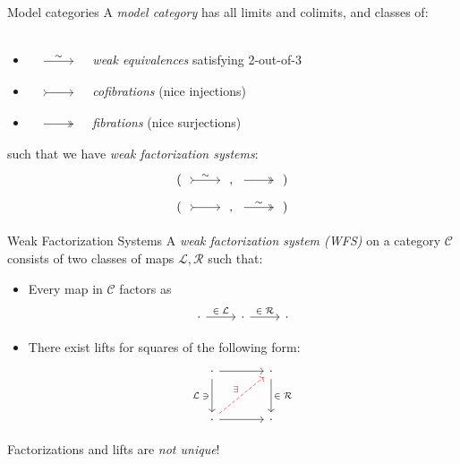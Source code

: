 \documentclass[compress]{beamer}
\newcommand{\varcat}[1]{\mathcal{#1}}
\newcommand{\C}{\varcat{C}}
\renewcommand{\L}{\mathcal{L}}
\newcommand{\R}{\mathcal{R}}
\newcommand{\1}{\mathbf{1}}
\begin{document}
\begin{frame}[fragile]{Model categories}
	A \emph{model category} has all limits and colimits, and classes of: \\~\\
	\begin{itemize} \setlength{\itemsep}{15pt}
		\item $\begin{tikzcd} \phantom{\cdot} \ar[r, "\sim"] & \phantom{\cdot} \end{tikzcd}$ \emph{weak equivalences}  satisfying 2-out-of-3
		\item  $\begin{tikzcd} \phantom{\cdot} \ar[r, rightarrowtail] & \phantom{\cdot} \end{tikzcd}$ \emph{cofibrations} (nice injections)
		\item  $\begin{tikzcd} \phantom{\cdot} \ar[r, two heads] & \phantom{\cdot} \end{tikzcd}$ \emph{fibrations} (nice surjections)
	\end{itemize}
	\pause \vfill
	such that we have \emph{weak factorization systems}:
	\[
		\begin{tikzcd}[row sep = tiny]
			(\phantom{\cdot} \ar[r, rightarrowtail, "\sim"] & \phantom{\cdot},
			 \phantom{\cdot} \ar[r, two heads] & \phantom{\cdot})
			 \\
			(\phantom{\cdot} \ar[r, rightarrowtail] & \phantom{\cdot},
			 \phantom{\cdot} \ar[r, two heads, "\sim"] & \phantom{\cdot})
		\end{tikzcd}
	\]
\end{frame}

\begin{frame}[fragile]{Weak Factorization Systems}
	A \emph{weak factorization system (WFS)} on a category $\C$ consists of two classes of maps $\L, \R$ such that:
	\pause
	\begin{itemize}[<+->]
		\item Every map in $\C$ factors as 
		\[
			\begin{tikzcd}
				\cdot \ar[r, "\in\; \L"] & \cdot \ar[r, "\in \; \R"] & \cdot
			\end{tikzcd}
		\]
		\item There exist lifts for squares of the following form:
		\[
		\begin{tikzcd}[sep = large]
			\cdot \ar[r] \ar[d, "\L \; \ni"'] & \cdot \ar[d, "\in \; \R"]
			\\
			\cdot \ar[r] \ar[ur, dashed, "\exists", red] & \cdot
		\end{tikzcd}
		\]
	\end{itemize}
	\pause
	Factorizations and lifts are \emph{not unique}!
\end{frame}
\end{document}
